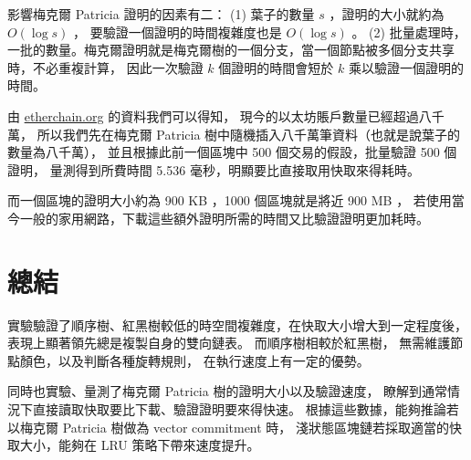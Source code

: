 影響梅克爾 Patricia 證明的因素有二：
(1) 葉子的數量 $s$ ，證明的大小就約為 $O(\log s)$ ， 要驗證一個證明的時間複雜度也是 $O(\log s)$ 。
(2) 批量處理時，一批的數量。梅克爾證明就是梅克爾樹的一個分支，當一個節點被多個分支共享時，不必重複計算，
因此一次驗證 $k$ 個證明的時間會短於 $k$ 乘以驗證一個證明的時間。

由 \href{https://www.etherchain.org/charts/totalAccounts}{etherchain.org} 的資料我們可以得知，
現今的以太坊賬戶數量已經超過八千萬，
所以我們先在梅克爾 Patricia 樹中隨機插入八千萬筆資料（也就是說葉子的數量為八千萬），
並且根據此前一個區塊中 500 個交易的假設，批量驗證 500 個證明，
量測得到所費時間 5.536 毫秒，明顯要比直接取用快取來得耗時。

而一個區塊的證明大小約為 900 KB ，1000 個區塊就是將近 900 MB ，
若使用當今一般的家用網路，下載這些額外證明所需的時間又比驗證證明更加耗時。

\section{總結}

實驗驗證了順序樹、紅黑樹較低的時空間複雜度，在快取大小增大到一定程度後，
表現上顯著領先總是複製自身的雙向鏈表。 而順序樹相較於紅黑樹，
無需維護節點顏色，以及判斷各種旋轉規則，
在執行速度上有一定的優勢。

同時也實驗、量測了梅克爾 Patricia 樹的證明大小以及驗證速度，
瞭解到通常情況下直接讀取快取要比下載、驗證證明要來得快速。
根據這些數據，能夠推論若以梅克爾 Patricia 樹做為 vector commitment 時，
淺狀態區塊鏈若採取適當的快取大小，能夠在 LRU 策略下帶來速度提升。